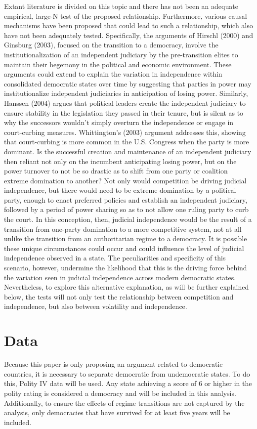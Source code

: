 \documentclass[12pt]{article}
\begin{document}
Extant literature is divided on this topic and there has not been an adequate empirical, large-N test of the proposed relationship. Furthermore, various causal mechanisms have been proposed that could lead to such a relationship, which also have not been adequately tested. Specifically, the arguments of Hirschl (2000) and Ginsburg (2003), focused on the transition to a democracy, involve the institutionalization of an independent judiciary by the pre-transition elites to maintain their hegemony in the political and economic environment. These arguments could extend to explain the variation in independence within consolidated democratic states over time by suggesting that parties in power may institutionalize independent judiciaries in anticipation of losing power. Similarly, Hanssen (2004) argues that political leaders create the independent judiciary to ensure stability in the legislation they passed in their tenure, but is silent as to why the successors wouldn't simply overturn the independence or engage in court-curbing measures. Whittington's (2003) argument addresses this, showing that court-curbing is more common in the U.S. Congress when the party is more dominant. Is the successful creation and maintenance of an independent judiciary then reliant not only on the incumbent anticipating losing power, but on the power turnover to not be so drastic as to shift from one party or coalition extreme domination to another? Not only would competition be driving judicial independence, but there would need to be extreme domination by a political party, enough to enact preferred policies and establish an independent judiciary, followed by a period of power sharing so as to not allow one ruling party to curb the court. In this conception, then, judicial independence would be the result of a transition from one-party domination to a more competitive system, not at all unlike the transition from an authoritarian regime to a democracy. It is possible these unique circumstances could occur and could influence the level of judicial independence observed in a state. The peculiarities and specificity of this scenario, however, undermine the likelihood that this is the driving force behind the variation seen in judicial independence across modern democratic states. Nevertheless, to explore this alternative explanation, as will be further explained below, the tests will not only test the relationship between competition and independence, but also between volatility and independence.



\section*{Data}
Because this paper is only proposing an argument related to democratic countries, it is necessary to separate democratic from undemocratic states. To do this, Polity IV data will be used. Any state achieving a score of 6 or higher in the polity rating is considered a democracy and will be included in this analysis. Additionally, to ensure the effects of regime transitions are not captured by the analysis, only democracies that have survived for at least five years will be included.
\end{document}
